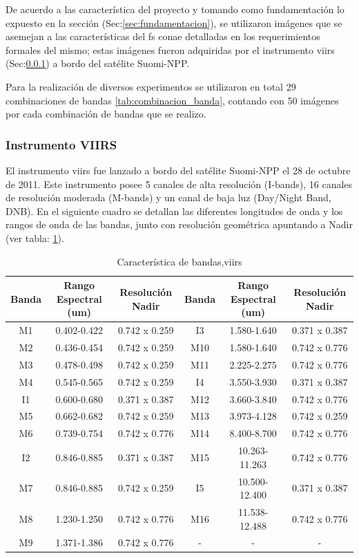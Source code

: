De acuerdo a las característica del proyecto y tomando como fundamentación lo expuesto en la sección (Sec:\ref{sec:fundamentacion}), se utilizaron imágenes que se asemejan a las características del \ac{fs} \ac{conae} detalladas en los requerimientos formales del mismo; estas imágenes fueron adquiridas por el instrumento \ac{viirs} (Sec:\ref{sub:viirs}) a bordo del satélite Suomi-NPP.


Para la realización de diversos experimentos se utilizaron en total 29 combinaciones de bandas \ref{tab:combinacion_banda}, contando con 50 imágenes por cada combinación de bandas que se realizo.


\subsubsection{Instrumento VIIRS}\label{sub:viirs}
El instrumento \ac{viirs} fue lanzado a bordo del satélite Suomi-NPP el 28 de octubre de 2011. Este instrumento posee 5 canales de alta resolución (I-bands), 16 canales de resolución moderada (M-bands) y un canal de baja luz (Day/Night Band, DNB).  En el siguiente cuadro se detallan las diferentes longitudes de onda y los rangos de onda de las bandas, junto con resolución geométrica apuntando a Nadir (ver tabla: \ref{tab:viirs}).
\begin{table}[H]
\begin{center}
\begin{tabular}{|c|c|c||c|c|c|}
\hline \textbf{Banda} & Rango Espectral (um) & Resolución Nadir & \textbf{Banda} & Rango Espectral (um) & Resolución Nadir \\\hline 
 		M1  & 0.402-0.422   & 0.742 x 0.259 & I3  & 1.580-1.640   & 0.371 x 0.387 \\ \hline 
		M2  & 0.436-0.454   & 0.742 x 0.259 & M10 & 1.580-1.640   & 0.742 x 0.776 \\ \hline 
		M3  & 0.478-0.498   & 0.742 x 0.259 & M11 & 2.225-2.275   & 0.742 x 0.776 \\ \hline 
		M4  & 0.545-0.565   & 0.742 x 0.259 & I4  & 3.550-3.930   & 0.371 x 0.387 \\ \hline 
		I1  & 0.600-0.680   & 0.371 x 0.387 & M12 & 3.660-3.840   & 0.742 x 0.776 \\ \hline 
		M5  & 0.662-0.682   & 0.742 x 0.259 & M13 & 3.973-4.128   & 0.742 x 0.259 \\ \hline 
		M6  & 0.739-0.754   & 0.742 x 0.776 & M14 & 8.400-8.700   & 0.742 x 0.776 \\ \hline 
		I2  & 0.846-0.885   & 0.371 x 0.387 & M15 & 10.263-11.263 & 0.742 x 0.776 \\ \hline 
		M7  & 0.846-0.885   & 0.742 x 0.259 & I5  & 10.500-12.400 & 0.371 x 0.387 \\ \hline 
		M8  & 1.230-1.250   & 0.742 x 0.776 & M16 & 11.538-12.488 & 0.742 x 0.776 \\ \hline 
		M9  & 1.371-1.386   & 0.742 x 0.776 & - &-&- \\ \hline 
\end{tabular}
\end{center}\caption{Característica de bandas,\ac{viirs} \label{tab:viirs}}
\end{table}

